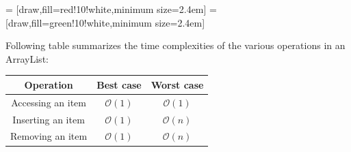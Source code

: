  = [draw,fill=red!10!white,minimum size=2.4em]
 = [draw,fill=green!10!white,minimum size=2.4em]

\newcommand{\data}{{{12.5, 6.4, 8.5, 9.6, -3.4, 0, 0, 0},
					{6.4, 6.4, 8.5, 9.6, -3.4, 0, 0, 0},
					{6.4, 8.5, 8.5, 9.6, -3.4, 0, 0, 0},
					{6.4, 8.5, 9.6, 9.6, -3.4, 0, 0, 0},
					{6.4, 8.5, 9.6, -3.4, -3.4, 0, 0, 0},
					{6.4, 8.5, 9.6, -3.4, -3.4, 0, 0, 0}}}

\vskip 1cm

Following table summarizes the time complexities of the various operations in an ArrayList:

\Large
\begin{center}
  \begin{tabular}{c|c|c}
    Operation & Best case & Worst case\\
    \hline
    Accessing an item & \color{ForestGreen} $\mathcal{O}(1)$ \color{black} & \color{ForestGreen} $\mathcal{O}(1)$ \color{black}\\
    \hline
    Inserting an item & \color{ForestGreen} $\mathcal{O}(1)$ \color{black} & \color{red} $\mathcal{O}(n)$ \color{black} \\
    \hline
    Removing an item & \color{ForestGreen} $\mathcal{O}(1)$ \color{black} & \color{red} $\mathcal{O}(n)$ \color{black}
  \end{tabular}
\end{center}
\normalsize

